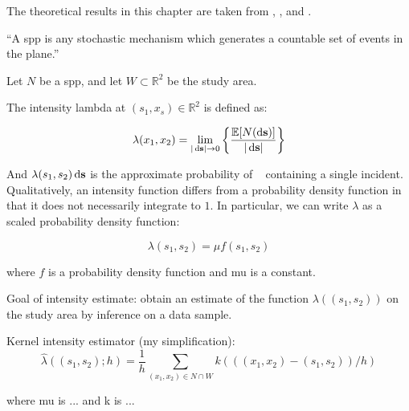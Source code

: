 


The theoretical results in this chapter are taken from \citet{diggle1988equivalence}, \citet{guan2008consistent}, and \citet{wand1994kernel}.

\begin{defn}
``A \gls{spp} is any stochastic mechanism which generates a countable set of events in the plane.''
\end{defn}

Let \(N\) be a \gls{spp}, and let \(W \subset \mathbb{R}^2 \) be the study area.

The intensity \gls{lambda} at \((s_1, x_s) \in \mathbb{R}^2\) is defined as:

\begin{equation}
\label{eq:lambda_differential}
    \lambda (x_1, x_2) = \lim_{|\ds| \to 0}
        \left\{
            \frac{\mathbb{E}[N(\ds)]}%
            {|\ds|}
        \right\}
\end{equation}

And \(\lambda(s_1, s_2) \mathop{}\!\mathrm{d}{\mathbf{s}}\) is the approximate probability of \ds~ containing a single incident.
Qualitatively, an intensity function differs from a probability density function in that it does not necessarily integrate to \(1\).
In particular, we can write \(\lambda\) as a scaled probability density function:

\begin{equation}
\label{eq:lambda_mu}
    \lambda(s_1, s_2) = \mu f\!(s_1, s_2)
\end{equation}

where \(f\) is a probability density function and \gls{mu} is a constant.

Goal of intensity estimate: obtain an estimate of the function \(\lambda((s_1, s_2))\) on the study area by inference on a data sample.

Kernel intensity estimator (my simplification):
\begin{equation}
\label{eq:lambda_hat}
    \hat{\lambda}((s_1, s_2); h) 
        = \frac{1}{h} \sum_{(x_1, x_2) \in N \cap W}
            {k(((x_1, x_2)-(s_1, s_2))/h)}
\end{equation}

where \gls{mu} is ... and \gls{k} is ...

